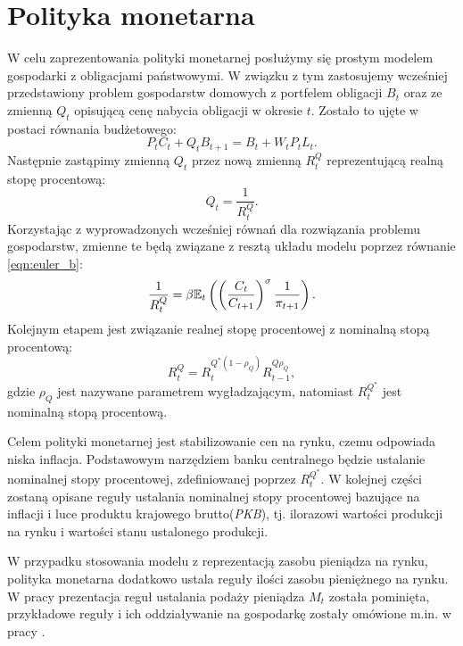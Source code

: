 \section{Polityka monetarna}
\label{sec:monetary_policy}

W celu zaprezentowania polityki monetarnej posłużymy się prostym modelem gospodarki z obligacjami państwowymi. W związku z tym zastosujemy wcześniej przedstawiony problem gospodarstw domowych z portfelem obligacji $B_t$ oraz ze zmienną $Q_t$ opisującą cenę nabycia obligacji w okresie $t$. Zostało to ujęte w postaci równania budżetowego:
\begin{equation}
    P_t C_t + Q_t B_{t+1} = B_{t} + W_t P_t L_t.
\end{equation}
Następnie zastąpimy zmienną $Q_t$ przez nową zmienną $R^Q_t$ reprezentującą realną stopę procentową:
\begin{equation}
    Q_t = \frac{1}{R^Q_t}.
\end{equation}
Korzystając z wyprowadzonych wcześniej równań dla rozwiązania problemu gospodarstw, zmienne te będą związane z resztą układu modelu poprzez równanie \eqref{eqn:euler_b}:
\begin{equation}
    \frac{1}{R^Q_t} = \beta \mathbb{E}_t \left( \left(\frac{C_t}{C_{t+1}}\right)^\sigma \frac{1}{\pi_{t+1}}\right).
\end{equation}
Kolejnym etapem jest związanie realnej stopę procentowej z nominalną stopą procentową:
\begin{equation}
    \label{eq:nominal_interest_rate}
    R^Q_t = R_t^{Q^*(1-\rho_Q)}R_{t-1}^{Q\rho_Q},
\end{equation}
gdzie $\rho_Q$ jest nazywane parametrem wygładzającym, natomiast $R^{Q^*}_t$ jest nominalną stopą procentową.

Celem polityki monetarnej jest stabilizowanie cen na rynku, czemu odpowiada niska inflacja. Podstawowym narzędziem banku centralnego będzie ustalanie nominalnej stopy procentowej, zdefiniowanej poprzez $R^{Q^*}_t$. W kolejnej części zostaną opisane reguły ustalania nominalnej stopy procentowej bazujące na inflacji i luce produktu krajowego brutto(\emph{PKB}), tj. ilorazowi wartości produkcji na rynku i wartości stanu ustalonego produkcji.

W przypadku stosowania modelu z reprezentacją zasobu pieniądza na rynku, polityka monetarna dodatkowo ustala reguły ilości zasobu pieniężnego na rynku. W pracy prezentacja reguł ustalania podaży pieniądza $M_t$ została pominięta, przykładowe reguły i ich oddziaływanie na gospodarkę zostały omówione m.in. w pracy \cite{gali}.


